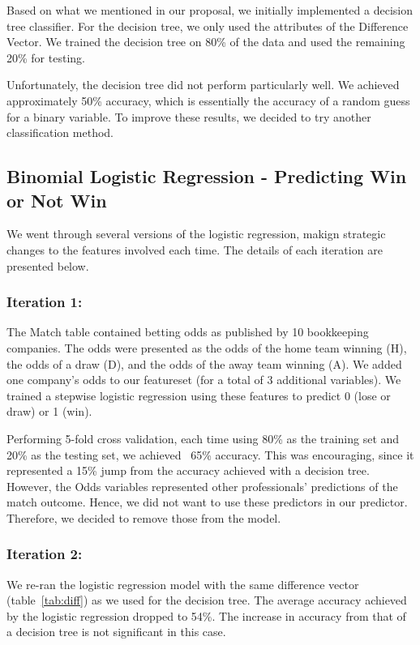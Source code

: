 \documentclass[11pt]{article}
\begin{document}
Based on what we mentioned in our proposal, we initially implemented a decision tree classifier.
For the decision tree, we only used the attributes of the Difference Vector.
We trained the decision tree on 80\% of the data and used the remaining 20\% for testing.

Unfortunately, the decision tree did not perform particularly well.
We achieved approximately 50\% accuracy, which is essentially the accuracy of a random guess for a binary variable.
To improve these results, we decided to try another classification method.

\subsection{Binomial Logistic Regression - Predicting Win or Not Win}
We went through several versions of the logistic regression, makign strategic changes to the features involved each time. The details of each iteration are presented below.

\subsubsection{Iteration 1:}
The Match table contained betting odds as published by 10 bookkeeping companies.
The odds were presented as the odds of the home team winning (H), the odds of a draw (D), and the odds of the away team winning (A).
We added one company's odds to our featureset (for a total of 3 additional variables).
We trained a stepwise logistic regression using these features to predict 0 (lose or draw) or 1 (win).

Performing 5-fold cross validation, each time using 80\% as the training set and 20\% as the testing set, we achieved ~65\% accuracy.
This was encouraging, since it represented a 15\% jump from the accuracy achieved with a decision tree.
However, the Odds variables represented other professionals' predictions of the match outcome.
Hence, we did not want to use these predictors in our predictor. Therefore, we decided to remove those from the model.

\subsubsection{Iteration 2:}
We re-ran the logistic regression model with the same difference vector (table~\ref{tab:diff}) as we used for the decision tree. The average accuracy achieved by the logistic regression dropped to 54\%. The increase in accuracy from that of a decision tree is not significant in this case.
\end{document}
